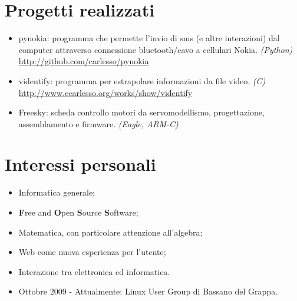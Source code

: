 \documentclass[pdftex, a4paper, 11pt]{article}
\begin{document}
\section*{Progetti realizzati}
\begin{itemize}
\item pynokia: programma che permette l'invio di sms (e
  altre interazioni) dal computer attraverso connessione
  bluetooth/cavo a cellulari Nokia. {\em (Python)}\\
  \url{http://github.com/carlesso/pynokia}
\item videntify: programma per estrapolare informazioni da
  file video. {\em (C)}\\
  \url{http://www.ecarlesso.org/works/show/videntify}
\item Freesky: scheda controllo motori da servomodellismo,
  progettazione, assemblamento e firmware. {\em (Eagle, ARM-C)}\\
\end{itemize}


\section*{Interessi personali}
\begin{itemize}
\item Informatica generale;
\item {\bf F}ree and {\bf O}pen {\bf S}ource {\bf S}oftware;
\item Matematica, con particolare attenzione all'algebra;
\item Web come nuova esperienza per l'utente;
\item Interazione tra elettronica ed informatica.
\item Ottobre 2009 - Attualmente: Linux User Group di Bassano del
  Grappa.
\end{itemize}
\end{document}
